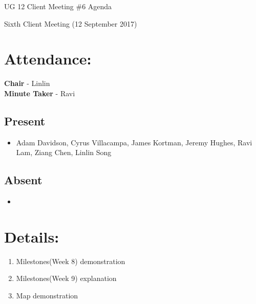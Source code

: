 \documentclass{article}
\begin{document}
\begin{adjustwidth}{2.5em}{0pt}
\begin{center}
\Large{UG 12 Client Meeting \#6 Agenda}\\
\end{center}
\end{adjustwidth}

Sixth Client Meeting (12 September 2017)
\section{Attendance:}
\textbf{Chair} - Linlin\\
\textbf{Minute Taker} - Ravi\\
\subsection*{Present}
\begin{itemize}
\item Adam Davidson, Cyrus Villacampa, James Kortman, Jeremy Hughes, Ravi Lam, Ziang Chen, Linlin Song
\end{itemize}
\subsection*{Absent}
\begin{itemize}
\item  
\end {itemize}

\section{Details:}
\begin{enumerate}
\item Milestones(Week 8) demonstration
\item Milestones(Week 9) explanation
\item Map demonstration

\end{enumerate}
\end{document}

